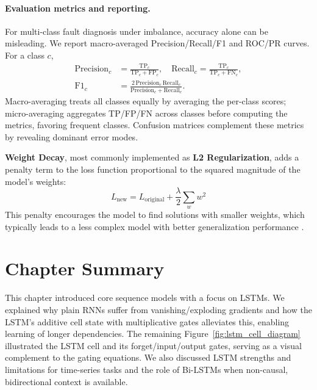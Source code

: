 \paragraph{Evaluation metrics and reporting.} For multi-class fault diagnosis under imbalance, accuracy alone can be misleading. We report macro-averaged Precision/Recall/F1 and ROC/PR curves. For a class \(c\),
\begin{align}
\mathrm{Precision}_c &= \frac{\mathrm{TP}_c}{\mathrm{TP}_c + \mathrm{FP}_c},\quad
\mathrm{Recall}_c = \frac{\mathrm{TP}_c}{\mathrm{TP}_c + \mathrm{FN}_c},\\
\mathrm{F1}_c &= \frac{2\,\mathrm{Precision}_c\,\mathrm{Recall}_c}{\mathrm{Precision}_c+\mathrm{Recall}_c}.
\end{align}
Macro-averaging treats all classes equally by averaging the per-class scores; micro-averaging aggregates TP/FP/FN across classes before computing the metrics, favoring frequent classes. Confusion matrices complement these metrics by revealing dominant error modes.

\textbf{Weight Decay}, most commonly implemented as \textbf{L2 Regularization}, adds a penalty term to the loss function proportional to the squared magnitude of the model's weights:
\begin{equation}
L_{\text{new}} = L_{\text{original}} + \frac{\lambda}{2} \sum_{w} w^2
\label{eq:l2_reg}
\end{equation}
This penalty encourages the model to find solutions with smaller weights, which typically leads to a less complex model with better generalization performance \citep{goodfellow2016deep}.


\section{Chapter Summary}
\label{sec:related_technologies:summary}

This chapter introduced core sequence models with a focus on LSTMs. We explained why plain RNNs suffer from vanishing/exploding gradients and how the LSTM’s additive cell state with multiplicative gates alleviates this, enabling learning of longer dependencies. The remaining Figure~\ref{fig:lstm_cell_diagram} illustrated the LSTM cell and its forget/input/output gates, serving as a visual complement to the gating equations. We also discussed LSTM strengths and limitations for time-series tasks and the role of Bi-LSTMs when non-causal, bidirectional context is available.
